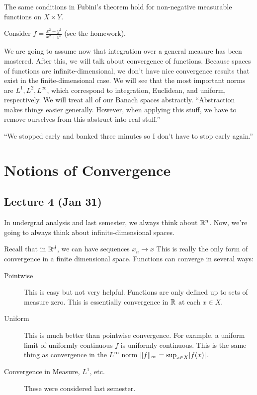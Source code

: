 \documentclass[10pt, twoside]{article}
\begin{document}
    \begin{thm}[Tonelli] The same conditions in Fubini's theorem hold for
    non-negative measurable functions on $X \times Y$.  \end{thm}

    \begin{exm} Consider $f =
    \frac{x^2-y^2}{x^2+y^2}$ (see the homework).  \end{exm}

    We are going to assume now that integration over a general measure has been
    mastered. After this, we will talk about convergence of functions. Because
    spaces of functions are infinite-dimensional, we don't have nice
    convergence results that exist in the finite-dimensional case. We will see
    that the most important norms are $L^1, L^2, L^{\infty}$, which correspond
    to integration, Euclidean, and uniform, respectively. We will treat all of
    our Banach spaces abstractly. ``Abstraction makes things easier generally.
    However, when applying this stuff, we have to remove ourselves from this
    abstruct into real stuff.''

    ``We stopped early and banked three minutes so I don't have to stop early
    again.''

    \section{Notions of Convergence} \subsection{Lecture 4 (Jan 31)}

    In undergrad analysis and last semester, we always think about $\mathbb{R}^n$. Now,
    we're going to always think about infinite-dimensional spaces.
    
    Recall that in $\mathbb{R}^d$, we can have sequences $x_n \rightarrow x$ This is
    really the only form of convergence in a finite dimensional space.
    Functions can converge in several ways: \begin{description}
        \item[Pointwise] This is easy but not very helpful. Functions are only
            defined up to sets of measure zero. This is essentially convergence
            in $\mathbb{R}$ at each $x \in X$.  \item[Uniform] This is much better than
            pointwise convergence. For example, a uniform limit of uniformly
            continuous $f$ is uniformly continuous. This is the same thing as
            convergence in the $L^{\infty}$ norm $\lVert f\rVert_{\infty} = \sup_{x
            \in X} \lvert f(x)\rvert$.  \item[Convergence in Measure, $L^1$, etc.]
    These were considered last semester.  \end{description}
\end{document}
